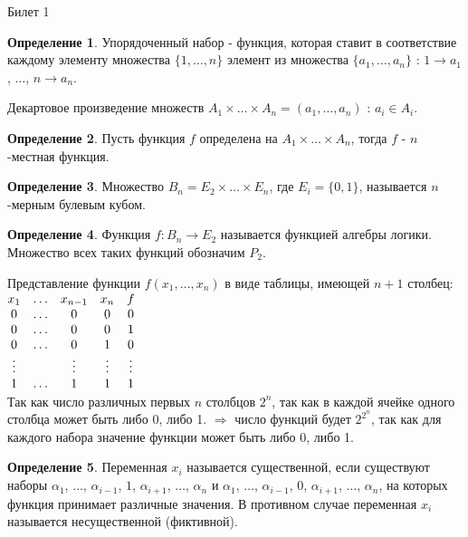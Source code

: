 \documentclass[a4paper, 12pt]{article}
\theoremstyle{definition}
\newtheorem*{definition}{Определение}
\theoremstyle{plain}
\theoremstyle{remark}
\begin{document}
  \newpage
  \begin{center}
    Билет 1
  \end{center}
  \begin{definition}
    Упорядоченный набор - функция, которая ставит в соответствие каждому элементу множества $\{1, \ldots, n\}$ элемент из множества $\{a_1,\ldots,a_n\}$ : $1\rightarrow a_1$, $\ldots$, $n\rightarrow a_n$.
  \end{definition}
  Декартовое произведение множеств $A_1\times\ldots\times A_n=(a_1, \ldots, a_n)$ : $a_i\in A_i$.
  \begin{definition}
    Пусть функция $f$ определена на $A_1\times\ldots\times A_n$, тогда $f$ - $n$-местная функция.
  \end{definition}
  \begin{definition}
    Множество $B_n=E_2\times\ldots\times E_n$, где $E_i=\{0,1\}$, называется $n$-мерным булевым кубом.
  \end{definition}
  \begin{definition}
    Функция $f:B_n \to E_2$ называется функцией алгебры логики. Множество всех таких функций обозначим $P_2$.
  \end{definition}
  Представление функции $f(x_1, \ldots, x_n)$ в виде таблицы, имеющей $n+1$ столбец:\\
  $\begin{matrix}
    x_1 & \ldots & x_{n-1} & x_n & f\\
    0 & \ldots & 0 & 0 & 0\\
    0 & \ldots & 0 & 0 & 1\\
    0 & \ldots & 0 & 1 & 0\\
    \vdots & \null & \vdots & \vdots & \vdots\\
    1 & \ldots & 1 & 1 & 1 
  \end{matrix}$\\
  Так как число различных первых $n$ столбцов $2^n$, так как в каждой ячейке одного столбца может быть либо 0, либо 1. $\Longrightarrow$ число функций будет $2^{2^n}$, так как для каждого набора значение функции может быть либо 0, либо 1.
  \begin{definition}
    Переменная $x_i$ называется существенной, если существуют наборы $\alpha_1$, $\ldots$, $\alpha_{i-1}$, $1$, $\alpha_{i+1}$, $\ldots$, $\alpha_n$ и $\alpha_1$, $\ldots$, $\alpha_{i-1}$, $0$, $\alpha_{i+1}$, $\ldots$, $\alpha_n$, на которых функция принимает различные значения. В противном случае переменная $x_i$ называется несущественной (фиктивной).
  \end{definition}
\end{document}
